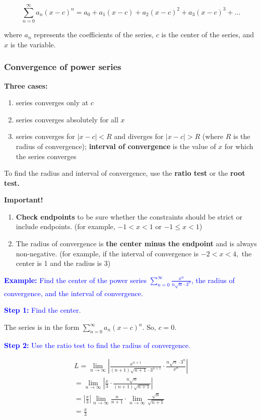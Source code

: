 \documentclass[letterpaper, 12pt]{article}
\newcommand{\example}[1]{\textcolor{blue}{\textbf{Example:} #1}}
\newcommand{\step}[2]{\textcolor{blue}{\textbf{Step #1:} #2}}
\begin{document}
$$\sum_{n=0}^\infty a_n (x-c)^n = a_0 + a_1 (x-c) + a_2 (x-c)^2 + a_3 (x-c)^3 + \dots$$

where $a_n$ represents the coefficients of the series, $c$ is the center of the series, and $x$ is the variable.

\subsubsection*{Convergence of power series}

\textbf{Three cases:}

\begin{enumerate}
\item series converges only at $c$
\item series converges absolutely for all $x$
\item series converges for $|x-c| < R$ and diverges for $|x-c| > R$ (where $R$ is the radius of convergence); \textbf{interval of convergence} is the value of $x$ for which the series converges
\end{enumerate}

To find the radius and interval of convergence, use the \textbf{ratio test} or the \textbf{root test.}

\textbf{Important!}

\begin{enumerate}
\item \textbf{Check endpoints} to be sure whether the constraints should be strict or include endpoints. (for example, $-1 < x < 1$ or $-1 \leq x < 1$)
\item The radius of convergence is \textbf{the center minus the endpoint} and is always non-negative. (for example, if the interval of convergence is $-2 < x < 4,$ the center is 1 and the radius is 3)
\end{enumerate}

\example{Find the center of the power series $\displaystyle \sum_{n=0}^\infty \frac{x^n}{n \sqrt{n} \cdot 3^n}$, the radius of convergence, and the interval of convergence.}

\step{1}{Find the center.}

The series is in the form $\displaystyle \sum_{n=0}^\infty a_n (x-c)^n.$ So, $\boxed{c = 0}.$

\step{2}{Use the ratio test to find the radius of convergence.}

\begin{gather*}
L = \lim_{n \to \infty} \left| \frac{x^{n+1}}{(n+1) \sqrt{n+1} \cdot 3^{n+1}} \cdot \frac{n \sqrt{n} \cdot 3^n}{x^n} \right| \\
= \lim_{n \to \infty} \left| \frac{x}{3} \cdot \frac{n \sqrt{n}}{(n+1) \sqrt{n+1}} \right| \\
= \left| \frac{x}{3} \right| \lim_{n \to \infty} \frac{n}{n+1} \cdot \lim_{n \to \infty} \frac{\sqrt{n}}{\sqrt{n+1}} \\
= \frac{x}{3}
\end{gather*}
\end{document}
